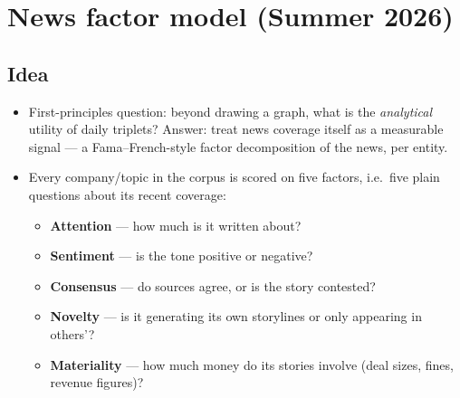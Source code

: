 \documentclass[11pt]{article}
\begin{document}
\section{News factor model (Summer 2026)}
\label{sec:factors}

\subsection{Idea}
\begin{itemize}
  \item First-principles question: beyond drawing a graph, what is the \emph{analytical} utility of daily triplets? Answer: treat news coverage itself as a measurable signal --- a Fama--French-style factor decomposition of the news, per entity.
  \item Every company/topic in the corpus is scored on five factors, i.e.\ five plain questions about its recent coverage:
  \begin{itemize}
    \item \textbf{Attention} --- how much is it written about?
    \item \textbf{Sentiment} --- is the tone positive or negative?
    \item \textbf{Consensus} --- do sources agree, or is the story contested?
    \item \textbf{Novelty} --- is it generating its own storylines or only appearing in others'?
    \item \textbf{Materiality} --- how much money do its stories involve (deal sizes, fines, revenue figures)?
  \end{itemize}
\end{itemize}
\end{document}
